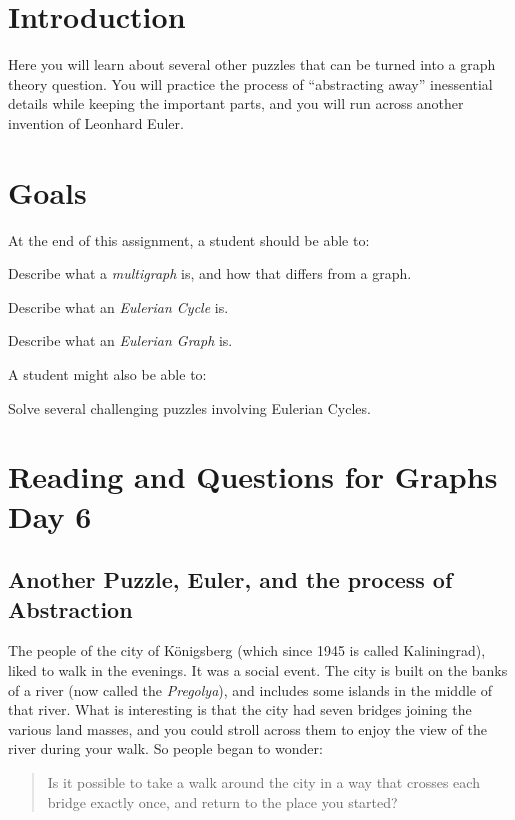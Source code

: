 \documentclass[12pt,letterpaper]{article}
\theoremstyle{definition}
\begin{document}
\setlength{\parskip}{1ex plus 0.5ex minus 0.2ex}
\setlength{\parindent}{0pt}

\pagestyle{fancy}
\cfoot{}

\section*{Introduction}

Here you will learn about several other puzzles that can be turned into a graph theory question. 
You will practice the process of ``abstracting away'' inessential details while keeping the important parts, 
and you will run across another invention of Leonhard Euler.

\section*{Goals}
At the end of this assignment, a student should be able to:
\begin{compactitem}
\item Describe what a \emph{multigraph} is, and how that differs from a graph.
\item Describe what an \emph{Eulerian Cycle} is.
\item Describe what an \emph{Eulerian Graph} is.
\end{compactitem}
A student might also be able to:
\begin{compactitem}
\item Solve several challenging puzzles involving Eulerian Cycles.
\end{compactitem}

\section*{Reading and Questions for Graphs Day 6}

\subsection*{Another Puzzle, Euler, and the process of Abstraction}

The people of the city of K\"{o}nigsberg (which since 1945 is called Kaliningrad), liked to walk in the evenings. It
was a social event. The city is built on the banks of a river (now called the \emph{Pregolya}), and includes some
islands in the middle of that river. What is interesting is that the city had seven bridges joining the various
land masses, and you could stroll across them to enjoy the view of the river during your walk. So people began
to wonder:
\begin{quote}
Is it possible to take a walk around the city in a way that crosses each bridge exactly once, and return to the
place you started?
\end{quote}
\end{document}

